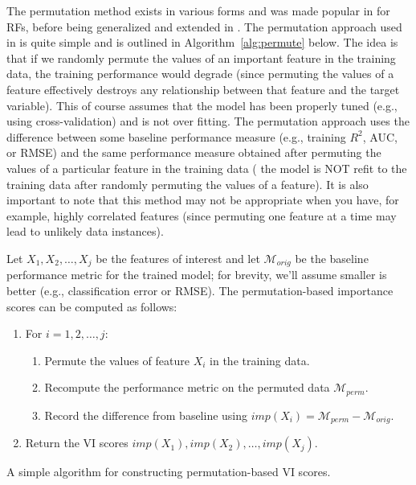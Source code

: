 The permutation method exists in various forms and was made popular in \citet{random-breiman-2001} for RFs, before being generalized and extended in \citet{fisher-model-2018}. The permutation approach used in  is quite simple and is outlined in Algorithm~\ref{alg:permute} below. The idea is that if we randomly permute the values of an important feature in the training data, the training performance would degrade (since permuting the values of a feature effectively destroys any relationship between that feature and the target variable). This of course assumes that the model has been properly tuned (e.g., using cross-validation) and is not over fitting. The permutation approach uses the difference between some baseline performance measure (e.g., training $R^2$, AUC, or RMSE) and the same performance measure obtained after permuting the values of a particular feature in the training data ( the model is NOT refit to the training data after randomly permuting the values of a feature). It is also important to note that this method may not be appropriate when you have, for example, highly correlated features (since permuting one feature at a time may lead to unlikely data instances). 

Let $X_1, X_2, \dots, X_j$ be the features of interest and let $\mathcal{M}_{orig}$ be the baseline performance metric for the trained model; for brevity, we'll assume smaller is better (e.g., classification error or RMSE). The permutation-based importance scores can be computed as follows:

\begin{algorithm}
\begin{enumerate}
  \item For $i = 1, 2, \dots, j$:
  \begin{enumerate}
    \item Permute the values of feature $X_i$ in the training data.
    \item Recompute the performance metric on the permuted data $\mathcal{M}_{perm}$.
    \item Record the difference from baseline using $imp\left(X_i\right) = \mathcal{M}_{perm} - \mathcal{M}_{orig}$.
  \end{enumerate}
  \item Return the VI scores $imp\left(X_1\right), imp\left(X_2\right), \dots, imp\left(X_j\right)$.
\end{enumerate}
\caption{A simple algorithm for constructing permutation-based VI scores. \label{alg:permute}}
\end{algorithm}


